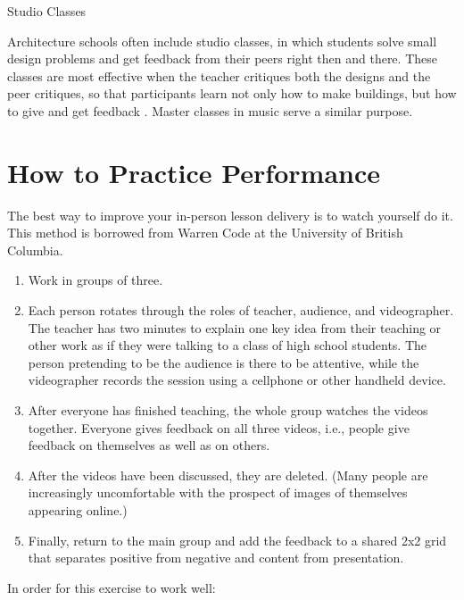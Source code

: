 \begin{aside}{Studio Classes}

Architecture schools often include studio classes, in which students
solve small design problems and get feedback from their peers right
then and there. These classes are most effective when the teacher
critiques both the designs and the peer critiques, so that
participants learn not only how to make buildings, but how to give and
get feedback \cite{Scho1984}. Master classes in music serve a
similar purpose.

\end{aside}

\section{How to Practice Performance}\label{s:performance-practice}

The best way to improve your in-person lesson delivery is to watch
yourself do it. This method is borrowed from Warren Code at the
University of British Columbia.

\begin{enumerate}
\item
  Work in groups of three.
\item
  Each person rotates through the roles of teacher, audience, and
  videographer. The teacher has two minutes to explain one key idea
  from their teaching or other work as if they were talking to a class
  of high school students. The person pretending to be the audience is
  there to be attentive, while the videographer records the session
  using a cellphone or other handheld device.
\item
  After everyone has finished teaching, the whole group watches the
  videos together. Everyone gives feedback on all three videos, i.e.,
  people give feedback on themselves as well as on others.
\item
  After the videos have been discussed, they are deleted. (Many people
  are increasingly uncomfortable with the prospect of images of
  themselves appearing online.)
\item
  Finally, return to the main group and add the feedback to a shared
  2x2 grid that separates positive from negative and content from
  presentation.
\end{enumerate}

In order for this exercise to work well:

